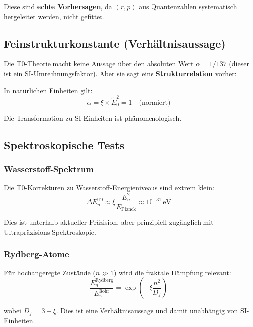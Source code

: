 Diese sind \textbf{echte Vorhersagen}, da $(r,p)$ aus Quantenzahlen systematisch 
hergeleitet werden, nicht gefittet.

\subsection{Feinstrukturkonstante (Verhältnisaussage)}

Die T0-Theorie macht keine Aussage über den absoluten Wert $\alpha = 1/137$ (dieser 
ist ein SI-Umrechnungsfaktor). Aber sie sagt eine \textbf{Strukturrelation} vorher:

In natürlichen Einheiten gilt:
\begin{equation}
	\tilde{\alpha} = \xi \times \tilde{E}_0^2 = 1 \quad \text{(normiert)}
\end{equation}

Die Transformation zu SI-Einheiten ist phänomenologisch.

\subsection{Spektroskopische Tests}

\subsubsection{Wasserstoff-Spektrum}

Die T0-Korrekturen zu Wasserstoff-Energieniveaus sind extrem klein:
\begin{equation}
	\Delta E_n^{\text{T0}} \approx \xi \frac{E_n^2}{E_{\text{Planck}}} 
	\approx 10^{-31}\,\text{eV}
\end{equation}

Dies ist unterhalb aktueller Präzision, aber prinzipiell zugänglich mit 
Ultrapräzisions-Spektroskopie.

\subsubsection{Rydberg-Atome}

Für hochangeregte Zustände ($n \gg 1$) wird die fraktale Dämpfung relevant:
\begin{equation}
	\frac{E_n^{\text{Rydberg}}}{E_n^{\text{Bohr}}} = \exp\left(-\xi \frac{n^2}{D_f}\right)
\end{equation}

wobei $D_f = 3 - \xi$. Dies ist eine Verhältnisaussage und damit unabhängig von 
SI-Einheiten.

